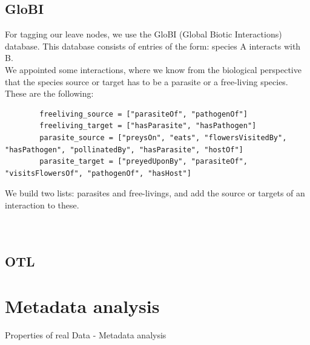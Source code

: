     \subsection{GloBI}
      For tagging our leave nodes, we use the GloBI (Global Biotic Interactions) database. This database 
        consists of entries of the form: species A interacts with B. \\
      We appointed some interactions, where we know from the biological perspective that the species 
      source or target has to be a parasite or a free-living species. These are the following:
      \begin{lstlisting}
        freeliving_source = ["parasiteOf", "pathogenOf"]
        freeliving_target = ["hasParasite", "hasPathogen"]
        parasite_source = ["preysOn", "eats", "flowersVisitedBy", "hasPathogen", "pollinatedBy", "hasParasite", "hostOf"]
        parasite_target = ["preyedUponBy", "parasiteOf", "visitsFlowersOf", "pathogenOf", "hasHost"]
      \end{lstlisting}
      We build two lists: parasites and free-livings, and add the source or targets of an interaction
        to these. \\
       \\
       \\
    
    \subsection{OTL}

  \section{Metadata analysis}
    Properties of real Data - Metadata analysis

